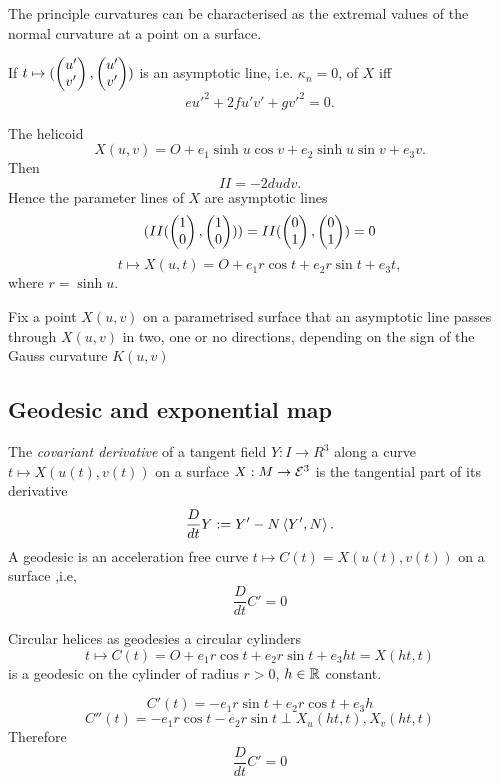 \begin{corollary}
	The principle curvatures can be characterised as the extremal values of the normal curvature at a point on a surface.
\end{corollary}

\begin{corollary}
	If $t \mapsto (\begin{pmatrix} u'\\v' \end{pmatrix},\begin{pmatrix} u'\\v' \end{pmatrix})$ is an asymptotic line, i.e. $\kappa_n = 0$, of $X$ iff 
		\[ eu'^2 + 2fu'v' + gv'^2 = 0. \]
\end{corollary}

\begin{example}
	The helicoid
		\[ X(u,v) = O + e_1 \sinh u \cos v + e_2 \sinh u \sin v + e_3 v. \]
	Then
		\[ II = -2dudv. \]
	Hence the parameter lines of $X$ are asymptotic lines 
		\[ (II(\begin{pmatrix} 1\\0 \end{pmatrix}, \begin{pmatrix} 1\\0 \end{pmatrix})) = II(\begin{pmatrix} 0\\1 \end{pmatrix}, \begin{pmatrix} 0\\1 \end{pmatrix}) = 0 \]
		\[ t \mapsto X(u,t) = O + e_1r \cos t + e_2 r \sin t + e_3 t, \]
	where $r=\sinh u$.
\end{example}

\begin{lemma}
	Fix a point $X(u,v)$ on a parametrised surface that an asymptotic line passes through $X(u,v)$  in two, one or no directions, depending on the sign of the Gauss curvature $K(u,v)$
\end{lemma}

\subsection{Geodesic and exponential map}

\begin{definition}
	The \emph{covariant derivative} of a tangent field $Y: I \to R^3$ along a curve $t \mapsto X(u(t),v(t))$ on a surface $X:M \to \mathcal E^3$ is the tangential part of its derivative 
		\[ \frac {D}{dt} Y : = Y' - N \left \langle Y',N \right\rangle.  \]
	A geodesic is an acceleration free curve $t \mapsto C(t)=X(u(t),v(t))$ on a surface ,i.e,
		\[ \frac D{dt} C' = 0 \]
\end{definition}

\begin{example}
	Circular helices as geodesies a circular cylinders
		\[ t \mapsto C(t)= O+ e_1 r \cos t + e_2 r\sin t + e_3 h t = X(ht,t)  \]
	is a geodesic on the cylinder of radius $r>0$, $h\in \mathbb R$ constant.
	
		\[ C'(t) = -e_1 r\sin t + e_2 r \cos t +e_3 h \]
		\[ C''(t)= -e_1 r\cos t - e_2 r\sin t \perp X_u(ht,t), X_v(ht,t) \]
	Therefore
		\[ \frac D{dt} C' = 0 \]
\end{example}

